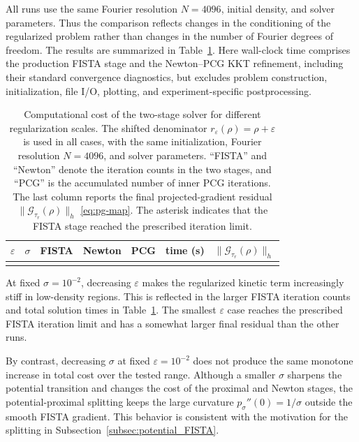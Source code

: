 \documentclass[11pt]{article}
\newcommand{\eps}{\varepsilon}
\newcommand{\sig}{\sigma}
\theoremstyle{plain}
\theoremstyle{definition}
\numberwithin{equation}{section}
\begin{document}
All runs use the same Fourier resolution $N=4096$, initial density,
and solver parameters. Thus the comparison reflects changes in the
conditioning of the regularized problem rather than changes in the
number of Fourier degrees of freedom. The results are summarized in
Table~\ref{tab:solver-regularization-cost}.
Here wall-clock time comprises the production FISTA stage and the
Newton--PCG KKT refinement, including their standard convergence
diagnostics, but excludes problem construction, initialization, file
I/O, plotting, and experiment-specific postprocessing.

\begin{table}[t]
\centering
\caption{
Computational cost of the two-stage solver for different
regularization scales. The shifted denominator
$r_\eps(\rho)=\rho+\eps$ is used in all cases, with the same
initialization, Fourier resolution $N=4096$, and solver parameters.
``FISTA'' and ``Newton'' denote the iteration counts in the two
stages, and ``PCG'' is the accumulated number of inner PCG
iterations. The last column reports the final projected-gradient
residual $\|\mathcal G_{\tau_r}(\rho)\|_h$ \eqref{eq:pg-map}. The asterisk indicates that the FISTA stage reached the
prescribed iteration limit.
}
\label{tab:solver-regularization-cost}
\begin{tabular}{ccccccc}
\toprule
$\eps$ & $\sig$
& FISTA & Newton & PCG
& time (s) & $\|\mathcal G_{\tau_r}(\rho)\|_h$ \\
\midrule
\\
\bottomrule
\end{tabular}
\end{table}

At fixed $\sig=10^{-2}$, decreasing $\eps$ makes the regularized
kinetic term increasingly stiff in low-density regions. This is
reflected in the larger FISTA iteration counts and total solution
times in Table~\ref{tab:solver-regularization-cost}. The smallest
$\eps$ case reaches the prescribed FISTA iteration limit and has a
somewhat larger final residual than the other runs.

By contrast, decreasing $\sig$ at fixed $\eps=10^{-2}$ does not
produce the same monotone increase in total cost over the tested
range. Although a smaller $\sig$ sharpens the potential transition
and changes the cost of the proximal and Newton stages, the
potential-proximal splitting keeps the large curvature
$p_\sig''(0)=1/\sig$ outside the smooth FISTA gradient. This behavior
is consistent with the motivation for the splitting in
Subsection~\ref{subsec:potential_FISTA}.
\end{document}

